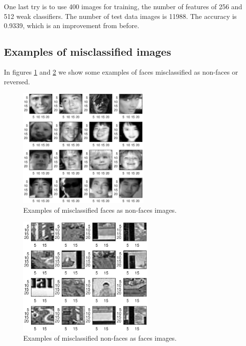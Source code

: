 \documentclass{article}
\begin{document}
One last try is to use 400 images for training, the number of features of 256 and 512 weak classifiers. The number of test data images is 11988. The accuracy is 0.9339, which is an improvement from before.


\subsection{Examples of misclassified images}

In figures \ref{fig:hard_faces} and \ref{fig:hard_nonfaces} we show some examples of faces misclassified as non-faces or reversed.

\begin{figure}[h]
\centering
\includegraphics[height=6cm]{images/hard_faces}
\caption{Examples of misclassified faces as non-faces images.}
\label{fig:hard_faces}
\end{figure}

\begin{figure}[h]
\centering
\includegraphics[height=6cm]{images/hard_nonfaces}
\caption{Examples of misclassified non-faces as faces images.}
\label{fig:hard_nonfaces}
\end{figure}
\end{document}
